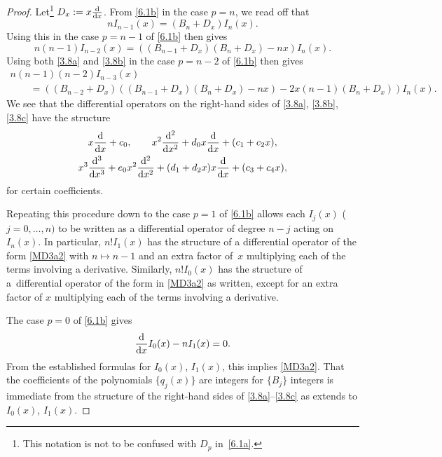 \documentclass[pdftex]{sigma}
\numberwithin{equation}{section}
\theoremstyle{definition}
\begin{document}
 \begin{proof}
 Let\footnote{This notation is not to be confused with $D_p$ in~\eqref{6.1a}.} $D_x := x {{\rm d} \over{\rm d} x}$.
 From \eqref{6.1b} in the case $p=n$, we read off that
 \begin{equation}\label{3.8a}
 n I_{n-1}(x) = (B_n + D_x) I_{n}(x).
 \end{equation}
 Using this in the case $p=n-1$ of \eqref{6.1b} then gives
 \begin{equation}\label{3.8b}
 n ( n - 1 ) I_{n-2}(x) = ((B_{n-1} + D_x)
 (B_{n} + D_x) - n x )
 I_{n}(x).
 \end{equation}
 Using both \eqref{3.8a} and \eqref{3.8b} in the case $p=n-2$ of
\eqref{6.1b} then gives
 \begin{gather}
 n ( n - 1 )(n-2) I_{n-3}(x)\nonumber\\
 \qquad = ( (B_{n-2} + D_x) ((B_{n-1} + D_x)
 (B_{n} + D_x) - n x )
 -2 x (n-1) (B_{n} + D_x) )
 I_{n}(x).\label{3.8c}
 \end{gather}
 We see that the differential operators on the right-hand sides of \eqref{3.8a}, \eqref{3.8b}, \eqref{3.8c} have the structure
 \begin{gather*}%
 x {{\rm d} \over {\rm d}x} + c_0,\qquad
 x^2 {{\rm d}^2 \over {\rm d}x^2} + d_0 x {{\rm d} \over {\rm d}x}+
 (c_1 + c_2 x),\\
 x^3 {{\rm d}^3 \over {\rm d}x^3} + e_0 x^2 {{\rm d}^2 \over {\rm d}x^2}+
 (d_1 + d_2 x) x {{\rm d} \over {\rm d}x} +
 (c_3 + c_4x),
\end{gather*}
{for certain coefficients.}

Repeating this procedure down to the case $p=1$ of \eqref{6.1b} allows each $I_j(x)$ ($j=0,\dots,n)$ to be written as a differential operator of degree $n-j$ acting on $I_n(x)$. In particular,
$n! I_1(x)$ has the structure of a differential operator of the form \eqref{MD3a2} with $n \mapsto n - 1$ and an extra factor of~$x$ multiplying each of the terms involving a derivative. Similarly, $n! I_0(x)$ has the structure of a~differential operator of the form in
\eqref{MD3a2} as written, except for
an extra factor of $x$ multiplying each of the terms involving a derivative.

The case $p=0$ of \eqref{6.1b} gives
 \begin{equation}\label{op3a}
{{\rm d} \over{\rm d} x} I_0(x) - n I_1(x) = 0.
\end{equation}
From the established formulas for $I_0(x)$, $I_1(x)$, this implies \eqref{MD3a2}. That the coefficients of the polynomials $\{ q_j(x) \}$ are integers for $\{ B_j\}$ integers is immediate from the structure of the right-hand sides of
\eqref{3.8a}--\eqref{3.8c} as extends to $I_0(x)$, $I_1(x)$.
\end{proof}
\end{document}
